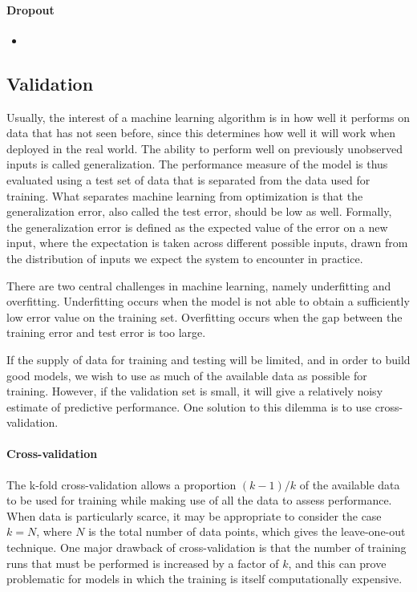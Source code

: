 \documentclass{scrartcl}
\begin{document}
\paragraph{Dropout}
\begin{itemize}
\item 
\end{itemize}


\subsection{Validation}

Usually, the interest of a machine learning algorithm is in how well it performs on data that has not seen before, since this determines how well it will work when deployed in the real world. The ability to perform well on previously unobserved inputs is called generalization. The performance measure of the model is thus evaluated using a test set of data that is separated from the data used for training. What separates machine learning from optimization is that the generalization error, also called the test error, should be low as well. Formally, the generalization error is defined as the expected value of the error on a new input, where the expectation is taken across different possible inputs, drawn from the distribution of inputs we expect the system to encounter in practice.

There are two central challenges in machine learning, namely underfitting and overfitting. Underfitting occurs when the model is not able to obtain a sufficiently low error value on the training set. Overfitting occurs when the gap between the training error and test error is too large.

If the supply of data for training and testing will be limited, and in order to build good models, we wish to use as much of the available data as possible for training. However, if the validation set is small, it will give a relatively noisy estimate of predictive performance. One solution to this dilemma is to use cross-validation.

\paragraph{Cross-validation}  The k-fold cross-validation allows a proportion $(k-1)/k$ of the available data to be used for training while making use of all the data to assess performance. When data is particularly scarce, it may be appropriate to consider the case $k=N$, where $N$ is the total number of data points, which gives the leave-one-out technique. One major drawback of cross-validation is that the number of training runs that must be performed is increased by a factor of $k$, and this can prove problematic for models in which the training is itself computationally expensive.
\end{document}
